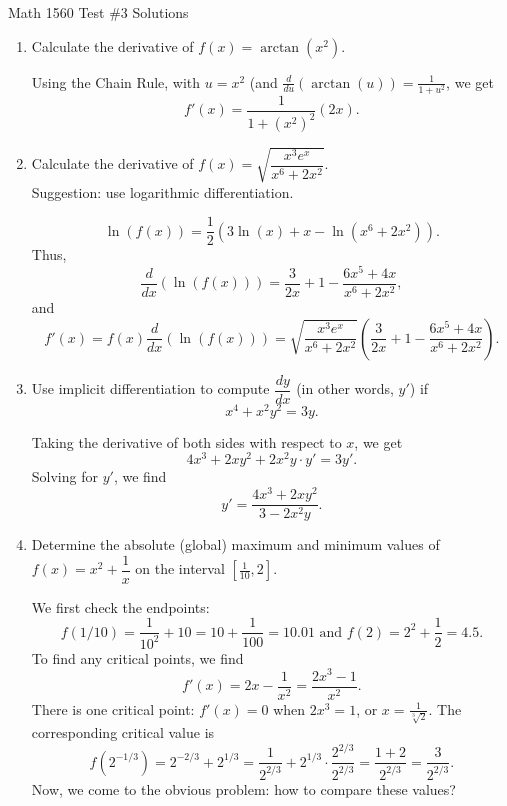 \documentclass[12pt]{article}
\newcommand{\points}[1]{\marginpar{\hspace{24pt}[#1]}}
\begin{document}
\begin{center}
Math 1560 Test \#3 Solutions
\end{center}

 \begin{enumerate}
 \item  Calculate the derivative of $f(x) = \arctan(x^2)$. \points{2}
 
\bigskip

Using the Chain Rule, with $u=x^2$ (and $\frac{d}{du}(\arctan(u)) = \frac{1}{1+u^2}$, we get
\[
f'(x) = \frac{1}{1+(x^2)^2}(2x).
\]

\medskip
 
 \item Calculate the derivative of $f(x) = \sqrt{\dfrac{x^3e^x}{x^6+2x^2}}$. \points{4}\\
 Suggestion: use logarithmic differentiation.
 
\medskip

\[
\ln(f(x)) = \frac{1}{2}\left(3\ln(x)+x-\ln(x^6+2x^2)\right).
\]
Thus,
\[
\frac{d}{dx}(\ln(f(x))) = \frac{3}{2x}+1-\frac{6x^5+4x}{x^6+2x^2},
\]
and
\[
f'(x) = f(x)\frac{d}{dx}(\ln(f(x))) = \sqrt{\dfrac{x^3e^x}{x^6+2x^2}}\left(\frac{3}{2x}+1-\frac{6x^5+4x}{x^6+2x^2}\right).
\]

\medskip
 
 \item Use implicit differentiation to compute $\dfrac{dy}{dx}$ (in other words, $y'$) if \points{4}
 \[
 x^4+x^2y^2=3y.
 \]
 
 \medskip
 
 Taking the derivative of both sides with respect to $x$, we get
 \[
 4x^3+2xy^2+2x^2y\cdot y' = 3y'.
 \]
 Solving for $y'$, we find
 \[
 y' = \frac{4x^3+2xy^2}{3-2x^2y}.
 \]
 \newpage
 
 \item Determine the absolute (global) maximum and minimum values of $f(x) = x^2+\dfrac{1}{x}$ on the interval $[\frac{1}{10},2]$. \points{4}

 \medskip
 
 We first check the endpoints:
 \[
 f(1/10) = \frac{1}{10^2}+10 = 10 + \frac{1}{100} = 10.01 \text{ and } f(2) = 2^2+\frac{1}{2} = 4.5.
 \]
 To find any critical points, we find
 \[
 f'(x) = 2x-\frac{1}{x^2} = \frac{2x^3-1}{x^2}.
 \]
 There is one critical point: $f'(x) = 0$ when $2x^3=1$, or $x= \frac{1}{\sqrt[3]{2}}$. The corresponding critical value is
 \[
 f(2^{-1/3}) = 2^{-2/3}+2^{1/3} = \frac{1}{2^{2/3}}+2^{1/3}\cdot \frac{2^{2/3}}{2^{2/3}} = \frac{1+2}{2^{2/3}} = \frac{3}{2^{2/3}}.
 \]
 Now, we come to the obvious problem: how to compare these values? 


\end{enumerate}
\end{document}
